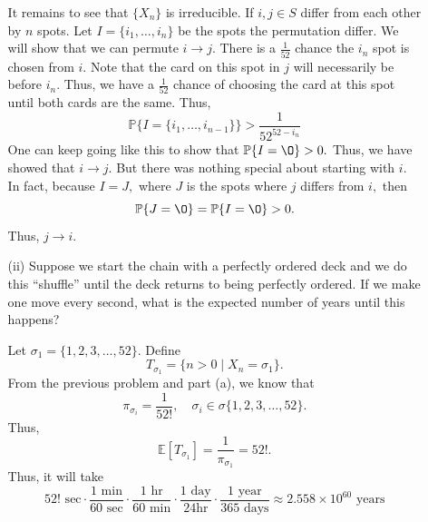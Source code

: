 \documentclass[11pt]{article}
\newcommand{\bbE}{\mathbb{E}}
\newcommand{\bbP}{\mathbb{P}}
\renewcommand{\emptyset}{\O}
\begin{document}
\begin{enumerate}
\begin{enumerate}
\begin{solution}
        It remains to see that $\{X_n\}$ is irreducible.  If $i,j \in S$ differ from each other by $n$ spots. Let $I = \{i_1, \dots, i_n\}$ be the spots the permutation differ. We will show that we can permute $i\to j.$ There is a $\frac{1}{52}$ chance the $i_n$ spot is chosen from $i$. Note that the card on this spot in $j$ will necessarily be before $i_n.$ Thus, we have a $\frac{1}{52}$ chance of choosing the card at this spot until both cards are the same. Thus, 
        \[\bbP\{I = \{i_1, \dots, i_{n-1}\}\} >\frac{1}{52^{52 - i_n}}\] One can keep going like this to show that $\bbP\{I = \emptyset\} >0.$ Thus, we have showed that $i \to j.$ But there was nothing special about starting with $i.$ In fact, because $I = J,$ where $J$ is the spots where $j$ differs from $i,$ then 
        \[\bbP\{J = \emptyset\} = \bbP\{I = \emptyset\} >0.\] Thus, $j\to i.$
    \end{solution}
        \item[(ii)] Suppose we start the chain with a perfectly ordered deck and we do this “shuffle” until the deck returns to being perfectly ordered. If we make one move every second, what is the expected number of years until this happens?
    \begin{solution}
        Let $\sigma_1  = \{1,2,3,\dots, 52\}.$ Define
        \[T_{\sigma_1} = \{n >0 \mid X_n = \sigma_1\}.\] From the previous problem and part (a), we know that 
        \[\pi_{\sigma_i} = \frac{1}{52!}, \quad \sigma_i \in \sigma\{1,2,3,\dots, 52\}.\] Thus, 
        \[\bbE[T_{\sigma_1}] = \frac{1}{\pi_{\sigma_1}} = 52!.\] Thus, it will take
        \[52! \text{ sec} \cdot \frac{1\text{ min}}{60 \text{ sec}}\cdot \frac{1 \text{ hr}}{60\text{ min}}\cdot \frac{1 \text{ day}}{24 \text{hr}}\cdot \frac{1 \text{ year}}{365 \text{ days}}\approx \boxed{2.558 \times 10^{60}\text{ years}}\]
    \end{solution}
    \end{enumerate}
\end{enumerate}

\newpage
\end{document}
